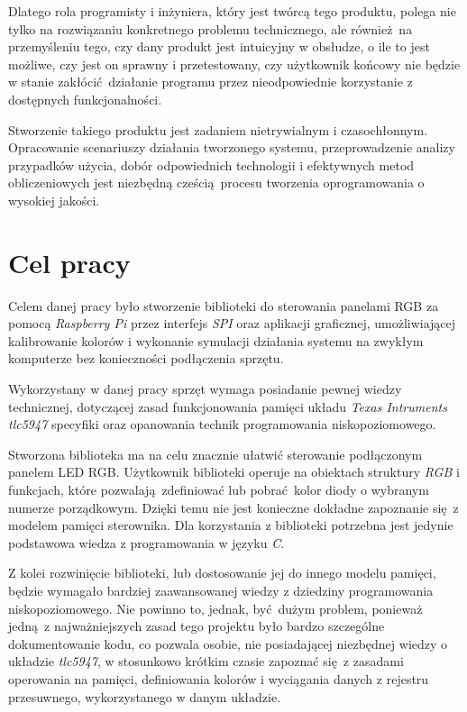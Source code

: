 \documentclass[eng,printmode]{mgr}
\begin{document}
Dlatego rola programisty i inżyniera, który jest twórcą tego produktu, polega nie tylko na rozwiązaniu konkretnego problemu technicznego, ale również na przemyśleniu tego, czy dany produkt jest intuicyjny w obsłudze, o ile to jest możliwe, czy jest on sprawny i przetestowany, czy użytkownik końcowy nie będzie w stanie zakłócić działanie programu przez nieodpowiednie korzystanie z dostępnych funkcjonalności.

Stworzenie takiego produktu jest zadaniem nietrywialnym i czasochłonnym. Opracowanie scenariuszy działania tworzonego systemu, przeprowadzenie analizy przypadków użycia, dobór odpowiednich technologii i efektywnych metod obliczeniowych jest niezbędną cześcią procesu tworzenia oprogramowania o wysokiej jakości.

\chapter{Cel pracy}

Celem danej pracy było stworzenie biblioteki do sterowania panelami RGB za pomocą \emph{Raspberry Pi} przez interfejs \emph{SPI} oraz aplikacji graficznej, umożliwiającej kalibrowanie kolorów i wykonanie symulacji działania systemu na zwykłym komputerze bez konieczności podłączenia sprzętu. 

Wykorzystany w danej pracy sprzęt wymaga posiadanie pewnej wiedzy technicznej, dotyczącej zasad funkcjonowania pamięci układu \emph{Texas Intruments tlc5947} specyfiki oraz opanowania technik programowania niskopoziomowego. 

Stworzona biblioteka ma na celu znacznie ułatwić sterowanie podłączonym panelem LED RGB. Użytkownik biblioteki operuje na obiektach struktury \emph{RGB} i funkcjach, które pozwalają zdefiniować lub pobrać kolor diody o wybranym numerze porządkowym. Dzięki temu nie jest konieczne dokładne zapoznanie się z modelem pamięci sterownika. Dla korzystania z biblioteki potrzebna jest jedynie podstawowa wiedza z programowania w języku \emph{C}. 

Z kolei rozwinięcie biblioteki, lub dostosowanie jej do innego modelu pamięci, będzie wymagało bardziej zaawansowanej wiedzy z dziedziny programowania niskopoziomowego. Nie powinno to, jednak, być dużym problem, ponieważ jedną z najważniejszych zasad tego projektu było bardzo szczególne dokumentowanie kodu, co pozwala osobie, nie posiadającej niezbędnej wiedzy o układzie \emph{tlc5947}, w stosunkowo krótkim czasie zapoznać się z zasadami operowania na pamięci, definiowania kolorów i wyciągania danych z rejestru przesuwnego, wykorzystanego w danym układzie.
\end{document}
